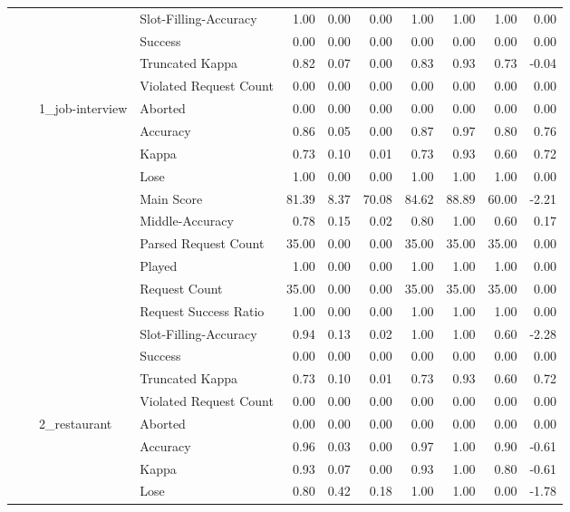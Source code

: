 \begin{tabular}{llllrrrrrrr}
 &  &  & Slot-Filling-Accuracy & 1.00 & 0.00 & 0.00 & 1.00 & 1.00 & 1.00 & 0.00 \\
 &  &  & Success & 0.00 & 0.00 & 0.00 & 0.00 & 0.00 & 0.00 & 0.00 \\
 &  &  & Truncated Kappa & 0.82 & 0.07 & 0.00 & 0.83 & 0.93 & 0.73 & -0.04 \\
 &  &  & Violated Request Count & 0.00 & 0.00 & 0.00 & 0.00 & 0.00 & 0.00 & 0.00 \\
\cline{3-11}
 &  & \multirow[t]{14}{*}{1_job-interview} & Aborted & 0.00 & 0.00 & 0.00 & 0.00 & 0.00 & 0.00 & 0.00 \\
 &  &  & Accuracy & 0.86 & 0.05 & 0.00 & 0.87 & 0.97 & 0.80 & 0.76 \\
 &  &  & Kappa & 0.73 & 0.10 & 0.01 & 0.73 & 0.93 & 0.60 & 0.72 \\
 &  &  & Lose & 1.00 & 0.00 & 0.00 & 1.00 & 1.00 & 1.00 & 0.00 \\
 &  &  & Main Score & 81.39 & 8.37 & 70.08 & 84.62 & 88.89 & 60.00 & -2.21 \\
 &  &  & Middle-Accuracy & 0.78 & 0.15 & 0.02 & 0.80 & 1.00 & 0.60 & 0.17 \\
 &  &  & Parsed Request Count & 35.00 & 0.00 & 0.00 & 35.00 & 35.00 & 35.00 & 0.00 \\
 &  &  & Played & 1.00 & 0.00 & 0.00 & 1.00 & 1.00 & 1.00 & 0.00 \\
 &  &  & Request Count & 35.00 & 0.00 & 0.00 & 35.00 & 35.00 & 35.00 & 0.00 \\
 &  &  & Request Success Ratio & 1.00 & 0.00 & 0.00 & 1.00 & 1.00 & 1.00 & 0.00 \\
 &  &  & Slot-Filling-Accuracy & 0.94 & 0.13 & 0.02 & 1.00 & 1.00 & 0.60 & -2.28 \\
 &  &  & Success & 0.00 & 0.00 & 0.00 & 0.00 & 0.00 & 0.00 & 0.00 \\
 &  &  & Truncated Kappa & 0.73 & 0.10 & 0.01 & 0.73 & 0.93 & 0.60 & 0.72 \\
 &  &  & Violated Request Count & 0.00 & 0.00 & 0.00 & 0.00 & 0.00 & 0.00 & 0.00 \\
\cline{3-11}
 &  & \multirow[t]{14}{*}{2_restaurant} & Aborted & 0.00 & 0.00 & 0.00 & 0.00 & 0.00 & 0.00 & 0.00 \\
 &  &  & Accuracy & 0.96 & 0.03 & 0.00 & 0.97 & 1.00 & 0.90 & -0.61 \\
 &  &  & Kappa & 0.93 & 0.07 & 0.00 & 0.93 & 1.00 & 0.80 & -0.61 \\
 &  &  & Lose & 0.80 & 0.42 & 0.18 & 1.00 & 1.00 & 0.00 & -1.78 \\

\end{tabular}
